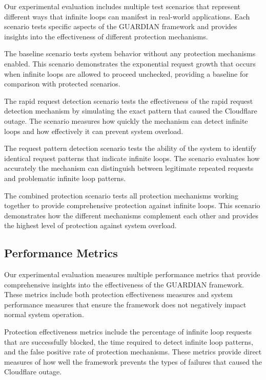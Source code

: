 \documentclass[10pt]{article}
\begin{document}
Our experimental evaluation includes multiple test scenarios that represent different ways that infinite loops can manifest in real-world applications. Each scenario tests specific aspects of the GUARDIAN framework and provides insights into the effectiveness of different protection mechanisms.

The baseline scenario tests system behavior without any protection mechanisms enabled. This scenario demonstrates the exponential request growth that occurs when infinite loops are allowed to proceed unchecked, providing a baseline for comparison with protected scenarios.

The rapid request detection scenario tests the effectiveness of the rapid request detection mechanism by simulating the exact pattern that caused the Cloudflare outage. The scenario measures how quickly the mechanism can detect infinite loops and how effectively it can prevent system overload.

The request pattern detection scenario tests the ability of the system to identify identical request patterns that indicate infinite loops. The scenario evaluates how accurately the mechanism can distinguish between legitimate repeated requests and problematic infinite loop patterns.

The combined protection scenario tests all protection mechanisms working together to provide comprehensive protection against infinite loops. This scenario demonstrates how the different mechanisms complement each other and provides the highest level of protection against system overload.

\subsection{Performance Metrics}

Our experimental evaluation measures multiple performance metrics that provide comprehensive insights into the effectiveness of the GUARDIAN framework. These metrics include both protection effectiveness measures and system performance measures that ensure the framework does not negatively impact normal system operation.

Protection effectiveness metrics include the percentage of infinite loop requests that are successfully blocked, the time required to detect infinite loop patterns, and the false positive rate of protection mechanisms. These metrics provide direct measures of how well the framework prevents the types of failures that caused the Cloudflare outage.
\end{document}
